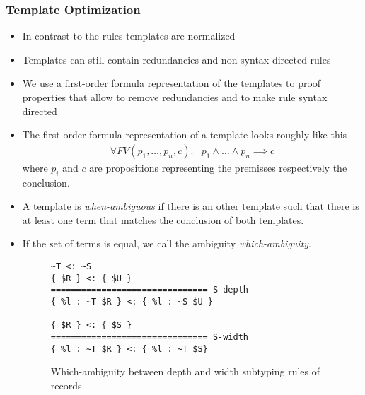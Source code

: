 \documentclass{beamer}
\begin{document}
\begin{frame}
  \frametitle{Template Optimization}
  \begin{itemize}
  \item In contrast to the rules templates are normalized
  \item Templates can still contain redundancies and
    non-syntax-directed rules
  \item We use a first-order formula representation of the templates
    to proof properties that allow to remove redundancies and to make
    rule syntax directed
  \item The first-order formula representation of a template looks
    roughly like this
    \begin{align}
      \forall FV(p_1,\dots, p_n, c) .& p_1 \land \dots \land p_n
      \implies c
    \end{align}
    where $p_i$ and $c$ are propositions representing the premisses
    respectively the conclusion.
  \end{itemize}

\framebreak{}

  \begin{itemize}
  \item A template is \textit{when-ambiguous} if there is an other
    template such that there is at least one term that matches the
    conclusion of both templates.
  \item If the set of terms is equal, we call the ambiguity
    \textit{which-ambiguity}.
\begin{figure}
\begin{lstlisting}
~T <: ~S
{ $R } <: { $U }
=============================== S-depth
{ %l : ~T $R } <: { %l : ~S $U }

{ $R } <: { $S }
=============================== S-width
{ %l : ~T $R } <: { %l : ~T $S}
\end{lstlisting}
\caption{Which-ambiguity between depth and width subtyping rules of records}
\end{figure}
\end{itemize}

\framebreak{}


\end{frame}
\end{document}

